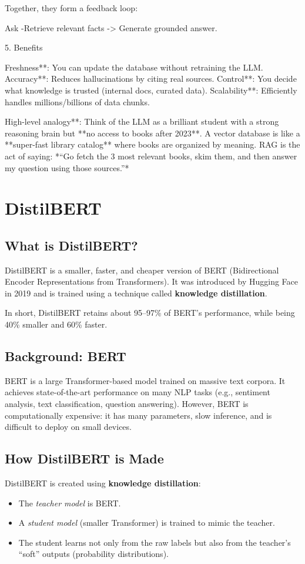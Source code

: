 \documentclass{article}
\begin{document}
Together, they form a feedback loop:

 Ask -Retrieve relevant facts -> Generate grounded answer.


 5. Benefits

Freshness**: You can update the database without retraining the LLM.
Accuracy**: Reduces hallucinations by citing real sources.
Control**: You decide what knowledge is trusted (internal docs, curated data).
Scalability**: Efficiently handles millions/billions of data chunks.

High-level analogy**:
Think of the LLM as a brilliant student with a strong reasoning brain but **no access to books after 2023**.
A vector database is like a **super-fast library catalog** where books are organized by meaning.
RAG is the act of saying: *“Go fetch the 3 most relevant books, skim them, and then answer my question using those sources.”*

\section*{DistilBERT}

\subsection*{What is DistilBERT?}
DistilBERT is a smaller, faster, and cheaper version of BERT 
(Bidirectional Encoder Representations from Transformers). 
It was introduced by Hugging Face in 2019 and is trained using a 
technique called \textbf{knowledge distillation}.  

In short, DistilBERT retains about 95--97\% of BERT's performance, 
while being 40\% smaller and 60\% faster.  

\subsection*{Background: BERT}
BERT is a large Transformer-based model trained on massive text corpora.  
It achieves state-of-the-art performance on many NLP tasks 
(e.g., sentiment analysis, text classification, question answering).  
However, BERT is computationally expensive: it has many parameters, 
slow inference, and is difficult to deploy on small devices.  

\subsection*{How DistilBERT is Made}
DistilBERT is created using \textbf{knowledge distillation}:  
\begin{itemize}
    \item The \textit{teacher model} is BERT.  
    \item A \textit{student model} (smaller Transformer) is trained to 
    mimic the teacher.  
    \item The student learns not only from the raw labels but also 
    from the teacher's ``soft'' outputs (probability distributions).  
\end{itemize}
\end{document}
